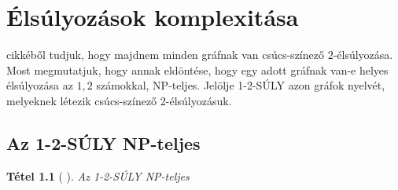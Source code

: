 \documentclass[12pt, a4paper]{report}
\newtheorem{tét}{Tétel}[section]
\theoremstyle{remark}
\theoremstyle{definition}
\begin{document}
\chapter{Élsúlyozások komplexitása}
\citeauthor{AddarioBerry2008} \cite{AddarioBerry2008} cikkéből tudjuk, hogy majdnem minden gráfnak van csúcs-színező $2$-élsúlyozása. Most megmutatjuk, hogy annak eldöntése, hogy egy adott gráfnak van-e helyes élsúlyozása az $1, 2$ számokkal, NP-teljes. Jelölje 1-2-SÚLY azon gráfok nyelvét, melyeknek létezik csúcs-színező $2$-élsúlyozásuk.

\section{Az 1-2-SÚLY NP-teljes}
\begin{tét}[\citeauthor{Dudek2011} \cite{Dudek2011}]
Az 1-2-SÚLY NP-teljes
\end{tét}
\end{document}
